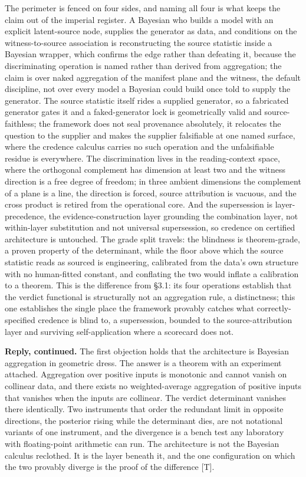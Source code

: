\documentclass[10pt,twocolumn]{article}
\begin{document}
The perimeter is fenced on four sides, and naming all four is what keeps
the claim out of the imperial register. A Bayesian who builds a model
with an explicit latent-source node, supplies the generator as data, and
conditions on the witness-to-source association is reconstructing the
source statistic inside a Bayesian wrapper, which confirms the edge
rather than defeating it, because the discriminating operation is named
rather than derived from aggregation; the claim is over naked
aggregation of the manifest plane and the witness, the default
discipline, not over every model a Bayesian could build once told to
supply the generator. The source statistic itself rides a supplied
generator, so a fabricated generator gates it and a faked-generator lock
is geometrically valid and source-faithless; the framework does not seal
provenance absolutely, it relocates the question to the supplier and
makes the supplier falsifiable at one named surface, where the credence
calculus carries no such operation and the unfalsifiable residue is
everywhere. The discrimination lives in the reading-context space, where
the orthogonal complement has dimension at least two and the witness
direction is a free degree of freedom; in three ambient dimensions the
complement of a plane is a line, the direction is forced, source
attribution is vacuous, and the cross product is retired from the
operational core. And the supersession is layer-precedence, the
evidence-construction layer grounding the combination layer, not
within-layer substitution and not universal supersession, so credence on
certified architecture is untouched. The grade split travels: the
blindness is theorem-grade, a proven property of the determinant, while
the floor above which the source statistic reads as sourced is
engineering, calibrated from the data's own structure with no
human-fitted constant, and conflating the two would inflate a
calibration to a theorem. This is the difference from §3.1: its four
operations establish that the verdict functional is structurally not an
aggregation rule, a distinctness; this one establishes the single place
the framework provably catches what correctly-specified credence is
blind to, a supersession, bounded to the source-attribution layer and
surviving self-application where a scorecard does not.

\textbf{Reply, continued.} The first objection holds that the
architecture is Bayesian aggregation in geometric dress. The answer is a
theorem with an experiment attached. Aggregation over positive inputs is
monotonic and cannot vanish on collinear data, and there exists no
weighted-average aggregation of positive inputs that vanishes when the
inputs are collinear. The verdict determinant vanishes there
identically. Two instruments that order the redundant limit in opposite
directions, the posterior rising while the determinant dies, are not
notational variants of one instrument, and the divergence is a bench
test any laboratory with floating-point arithmetic can run. The
architecture is not the Bayesian calculus reclothed. It is the layer
beneath it, and the one configuration on which the two provably diverge
is the proof of the difference {[}T{]}.
\end{document}
